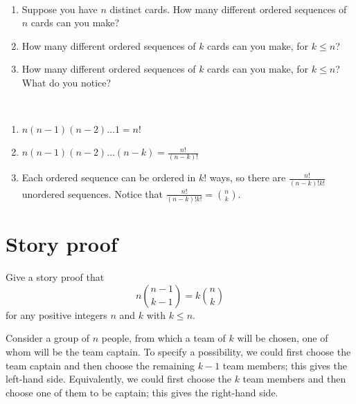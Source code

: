 	\begin{exercise}~
		\begin{enumerate}
			\item Suppose you have $n$ distinct cards. How many different ordered sequences of $n$ cards can you make?
			\item How many different ordered sequences of $k$ cards can you make, for $k \leq n$?
			\item How many different ordered sequences of $k$ cards can you make, for $k \leq n$? What do you notice?
		\end{enumerate}
		\begin{solution}~
			\begin{enumerate}
				\item $n(n - 1)(n - 2 )\ldots 1 = n!$
				\item $n(n - 1)(n - 2 )\ldots (n - k) = \frac{n!}{(n - k)!}$
				\item Each ordered sequence can be ordered in $k!$ ways, so there are $\frac{n!}{(n - k)!k!}$ unordered sequences. Notice that $\frac{n!}{(n - k)!k!} = \binom{n}{k}$.
			\end{enumerate}	
		\end{solution}
	\end{exercise}

\section{Story proof}
\label{sec:section-1.3}	 
	
	\begin{exercise}\label{ex:chap01:11}
		Give a story proof that
		\begin{equation}
			n \binom{n - 1}{k - 1} = k \binom{n}{k}
		\end{equation}
		for any positive integers $n$ and $k$ with $k \leq n$.
		\begin{solution}
			Consider a group of $n$ people, from which a team of $k$ will be chosen, one of whom will be the team captain. To specify a possibility, we could first choose the team captain and then choose the remaining $k - 1$ team members; this gives the left-hand side. Equivalently, we could first choose the $k$ team members and then choose one of them to be captain; this gives the right-hand side.
		\end{solution}
	\end{exercise}
	
